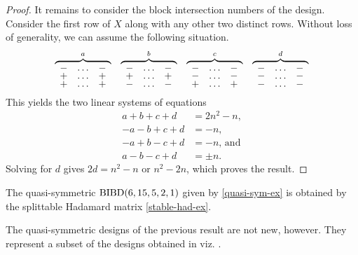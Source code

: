 \documentclass[../../../main]{subfiles}
\begin{document}
\begin{proof}
 It remains to consider the block intersection numbers of the design. Consider the first row of $X$ along with any other two distinct rows. Without loss of generality, we can assume the following situation.
 \[
 \def\arraystretch{0.65}
  \begin{array}{cccc}
   \overbrace{
   \begin{array}{ccc}
   - & \dots & - \\ + & \dots & + \\ + & \dots & +
   \end{array}
   }^a
   &
   \overbrace{
   \begin{array}{ccc}
   - & \dots & - \\ + & \dots & + \\ - & \dots & -
   \end{array}
   }^b
   &
   \overbrace{
   \begin{array}{ccc}
   - & \dots & - \\ - & \dots & - \\ + & \dots & +
   \end{array}
   }^c
   &
   \overbrace{
   \begin{array}{ccc}
   - & \dots & - \\ - & \dots & - \\ - & \dots & -
   \end{array}
   }^d
  \end{array}
 \]
 This yields the two linear systems of equations
 \begin{align*}
  a + b + c + d &= 2n^2-n, \\
  - a - b + c + d &= -n, \\
  - a + b - c + d &= -n \text{, and} \\
  a - b - c + d &= \pm n.
 \end{align*}
 Solving for $d$ gives $2d = n^2-n \text{ or } n^2-2n$, which proves the result.
\end{proof}

\begin{ex}
 The quasi-symmetric $\text{BIBD}(6,15,5,2,1)$ given by \ref{quasi-sym-ex} is obtained by the splittable Hadamard matrix \ref{stable-had-ex}.
\end{ex}

The quasi-symmetric designs of the previous result are not new, however. They represent a subset of the designs obtained in \cite{bracken-mcguire} viz. \cite{mcguire-grey-rankin-bound}.

\dinkus

\end{document}
